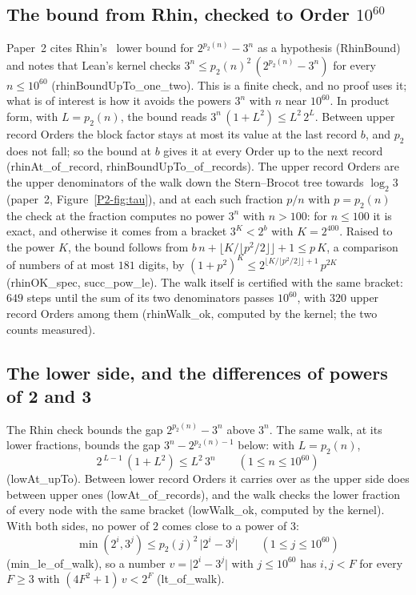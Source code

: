 \documentclass[10pt,a4paper,titlepage]{article}
\newcommand{\lean}[1]{\textsf{#1}}
\begin{document}
\subsection*{The bound from Rhin, checked to Order \texorpdfstring{$10^{60}$}{10\^{}60}}

Paper~2 cites Rhin's~\cite{Rhin1987} lower bound for $2^{p_2(n)} - 3^n$ as a hypothesis
(\lean{RhinBound}) and notes that Lean's kernel checks $3^n \le p_2(n)^2\,(2^{p_2(n)} - 3^n)$
for every $n \le 10^{60}$ (\lean{rhinBoundUpTo\_one\_two}). This is a finite check, and no
proof uses it; what is of interest is how it avoids the powers $3^n$ with $n$ near $10^{60}$.
In product form, with $L = p_2(n)$, the bound reads $3^n\,(1 + L^2) \le L^2\,2^L$. Between
upper record Orders the block factor stays at most its value at the last record $b$, and
$p_2$ does not fall; so the bound at $b$ gives it at every Order up to the next record
(\lean{rhinAt\_of\_record}, \lean{rhinBoundUpTo\_of\_records}). The upper record Orders are the
upper denominators of the walk down the Stern--Brocot tree towards $\log_2 3$ (paper~2,
Figure~\ref{P2-fig:tau}), and at each such fraction $p/n$ with $p = p_2(n)$ the check at the
fraction computes no power $3^n$ with $n > 100$: for $n \le 100$ it is exact, and otherwise it comes from a
bracket $3^K < 2^b$ with $K = 2^{400}$. Raised to the power $K$, the bound follows from
$b\,n + \lfloor K/\lfloor p^2/2 \rfloor \rfloor + 1 \le p\,K$, a comparison of numbers of at most
$181$ digits, by $(1 + p^2)^K \le 2^{\lfloor K/\lfloor p^2/2\rfloor\rfloor + 1}\,p^{2K}$
(\lean{rhinOK\_spec}, \lean{succ\_pow\_le}). The walk itself is certified with the same bracket:
$649$ steps until the sum of its two denominators passes $10^{60}$,
with $320$ upper record Orders among them (\lean{rhinWalk\_ok}, computed by the kernel; the two
counts measured).

\subsection*{The lower side, and the differences of powers of 2 and 3}

The Rhin check bounds the gap $2^{p_2(n)} - 3^n$ above $3^n$. The same walk, at its lower
fractions, bounds the gap $3^n - 2^{p_2(n)-1}$ below: with $L = p_2(n)$,
\[
2^{\,L-1}\,(1 + L^2) \le L^2\,3^n \qquad (1 \le n \le 10^{60})
\]
(\lean{lowAt\_upTo}). Between lower record Orders it carries over as the upper side does
between upper ones (\lean{lowAt\_of\_records}), and the walk checks the lower fraction of every
node with the same bracket (\lean{lowWalk\_ok}, computed by the kernel). With both sides, no
power of $2$ comes close to a power of $3$:
\[
\min(2^i, 3^j) \le p_2(j)^2\,\lvert 2^i - 3^j \rvert \qquad (1 \le j \le 10^{60})
\]
(\lean{min\_le\_of\_walk}), so a number $v = \lvert 2^i - 3^j \rvert$ with $j \le 10^{60}$ has
$i, j < F$ for every $F \ge 3$ with $(4F^2 + 1)\,v < 2^F$ (\lean{lt\_of\_walk}).
\end{document}
